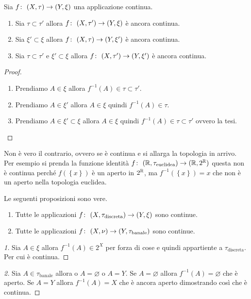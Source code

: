 \begin{theorem}
	Sia $f \colon\ (X,\tau) \rightarrow (Y,\xi)$ una applicazione continua. 
	\begin{enumerate}
		\item Sia $\tau \subset \tau'$ allora $f \colon\ (X,\tau') \rightarrow (Y,\xi)$ è ancora continua.
		\item Sia $\xi' \subset \xi$ allora $f \colon\ (X,\tau) \rightarrow (Y,\xi')$ è ancora continua.
		\item Sia $\tau \subset \tau'$ e $\xi' \subset \xi$ allora $f \colon\ (X,\tau') \rightarrow (Y,\xi')$ è ancora continua.
	\end{enumerate}
\end{theorem}
\begin{proof}
	\begin{enumerate}
		\item Prendiamo $A \in \xi$ allora $f^{-1}(A) \in \tau \subset \tau'$.
		\item Prendiamo $A \in \xi'$ allora $A \in \xi$ quindi $f^{-1}(A) \in \tau$. 
		\item Prendiamo $A \in \xi' \subset \xi$ allora $A \in \xi$ quindi $f^{-1}(A) \in \tau \subset \tau'$ ovvero la tesi.
	\end{enumerate}
\end{proof}

\begin{remark}
	Non è vero il contrario, ovvero se è continua e si allarga la topologia in arrivo. Per esempio si prenda la funzione identità $f \colon\ (\mathbb{R}, \tau_{\text{euclidea}}) \rightarrow (\mathbb{R}, 2^{\mathbb{R}})$ questa non è continua perché $f(\left\{x\right\})$ è un aperto in $2^{\mathbb{R}}$, ma $f^{-1}(\left\{x\right\}) = x$ che non è un aperto nella topologia euclidea.
\end{remark}

\begin{theorem}
	Le seguenti proposizioni sono vere.
	\begin{enumerate}
		\item Tutte le applicazioni $f \colon\ (X,\tau_{\text{discreta}}) \rightarrow (Y,\xi)$ sono continue.
		\item Tutte le applicazioni $f \colon\ (X,\nu) \rightarrow (Y,\tau_{\text{banale}})$ sono continue.
	\end{enumerate}
\end{theorem}
\begin{proof}[1]
	Sia $A\in \xi$ allora $f^{-1}(A) \in 2^X$ per forza di cose e quindi appartiente a $\tau_{\text{discreta}}$. Per cui è continua.
\end{proof}
\begin{proof}[2]
	Sia $A \in \tau_{\text{banale}}$ allora o $A = \varnothing$ o $A = Y$. Se $A = \varnothing$ allora $f^{-1}(A) = \varnothing$ che è aperto. Se $A = Y$ allora $f^{-1}(A) = X$ che è ancora aperto dimostrando così che è continua.
\end{proof}

